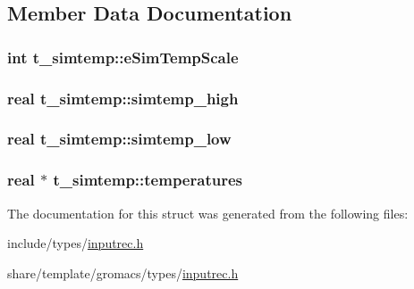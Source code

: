 \subsection{\-Member \-Data \-Documentation}
\hypertarget{structt__simtemp_a9a1aa21b2abfcc6af26a3b9b90dd6088}{
\subsubsection[{e\-Sim\-Temp\-Scale}]{\setlength{\rightskip}{0pt plus 5cm}int {\bf t\-\_\-simtemp\-::e\-Sim\-Temp\-Scale}}}\label{structt__simtemp_a9a1aa21b2abfcc6af26a3b9b90dd6088}
\hypertarget{structt__simtemp_acaa1ef151aec695d7df9d00a9b962a42}{
\subsubsection[{simtemp\-\_\-high}]{\setlength{\rightskip}{0pt plus 5cm}real {\bf t\-\_\-simtemp\-::simtemp\-\_\-high}}}\label{structt__simtemp_acaa1ef151aec695d7df9d00a9b962a42}
\hypertarget{structt__simtemp_ad923b0f345f2b823ed15c508897a4a14}{
\subsubsection[{simtemp\-\_\-low}]{\setlength{\rightskip}{0pt plus 5cm}real {\bf t\-\_\-simtemp\-::simtemp\-\_\-low}}}\label{structt__simtemp_ad923b0f345f2b823ed15c508897a4a14}
\hypertarget{structt__simtemp_a52387e0784ed448508c96e542b1d07b0}{
\subsubsection[{temperatures}]{\setlength{\rightskip}{0pt plus 5cm}real $\ast$ {\bf t\-\_\-simtemp\-::temperatures}}}\label{structt__simtemp_a52387e0784ed448508c96e542b1d07b0}


\-The documentation for this struct was generated from the following files\-:\begin{DoxyCompactItemize}
\item 
include/types/\hyperlink{include_2types_2inputrec_8h}{inputrec.\-h}\item 
share/template/gromacs/types/\hyperlink{share_2template_2gromacs_2types_2inputrec_8h}{inputrec.\-h}\end{DoxyCompactItemize}
